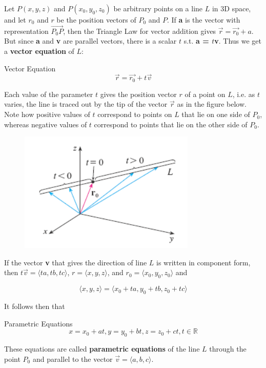        Let $P(x,y,z)$ and $P(x_0, y_0, z_0)$ be arbitrary points on a line $L$ in 3D space, and let $r_0$ and $r$ be the position vectors of $P_0$ and $P$. If \textbf{a} is the vector with representation $\vec{P_0 P}$,
        then the Triangle Law for vector addition gives $\vec{r} = \vec{r_0} + a$. But since \textbf{a} and \textbf{v} are parallel vectors, there is a scalar $t$ s.t. \textbf{a = $t$v}. Thus we get a \textbf{vector equation}
        of $L$:

        \begin{axiom}{Vector Equation}
            \[
                \vec{r} = \vec{r_0} + t\vec{v}
            \]

            Each value of the parameter $t$ gives the position vector $r$ of a point on $L$, i.e. as $t$ varies, the line is traced out by the tip of the vector $\vec{r}$ as in the figure below. Note how positive values
            of $t$ correspond to points on $L$ that lie on one side of $P_0$, whereas negative values of $t$ correspond to points that lie on the other side of $P_0$.
        \end{axiom}

        \begin{figure}[hbt!]
            \centering
            \includegraphics[]{Resources/12.5_Vector_Equation}
        \end{figure}

        If the vector \textbf{v} that gives the direction of line $L$ is written in component form, then $t\vec{v} = \langle ta, tb, tc\rangle$, $r = \langle x, y, z\rangle$, and $r_0 = \langle x_0, y_0, z_0 \rangle$
        and

        \[
            \langle x, y, z\rangle = \langle x_0 + ta, y_0 + tb, z_0 + tc\rangle
        \]

        It follows then that

        \begin{axiom}{Parametric Equations}
            \[
                x = x_0 + at, y = y_0 + bt, z = z_0 + ct, t\in \mathbb{R}
            \]

            These equations are called \textbf{parametric equations} of the line $L$ through the point $P_0$ and parallel to the vector $\vec{v} = \langle a, b, c\rangle$.
        \end{axiom}


